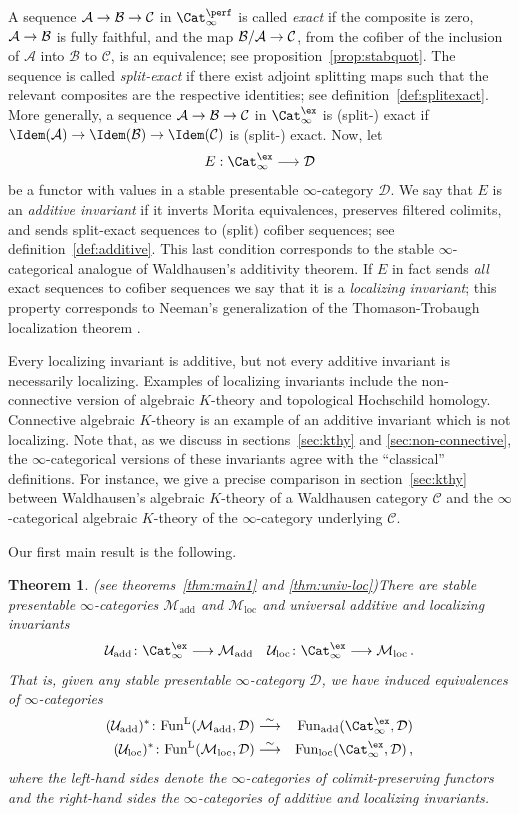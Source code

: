 \documentclass{amsart}
\renewcommand{\to}{\mathchoice{\longrightarrow}{\rightarrow}{\rightarrow}{\rightarrow}}
\newcommand{\cD}{{\mathcal D}}
\newcommand{\cM}{{\mathcal M}}
\newcommand{\cU}{{\mathcal U}}
\let\catsymbfont\mathcal
\newcommand{\aA}{{\catsymbfont{A}}}
\newcommand{\aB}{{\catsymbfont{B}}}
\newcommand{\aC}{{\catsymbfont{C}}}
\newcommand{\aD}{{\catsymbfont{D}}}
\renewcommand{\L}{\mathrm{L}}
\newcommand{\stabcat}{\Cat_\i^{\ex}}
\newcommand{\idemstabcat}{\Cat_\i^{\perf}}
\newcommand{\Fun}{\mathrm{Fun}} %
\newcommand{\too}{\longrightarrow}%
\renewcommand{\i}{\infty}
\newcommand{\Motadd}{\cM_{\mathrm{add}}}
\newcommand{\Motloc}{\cM_\mathrm{loc}}
\newcommand{\Umot}{\cU_{\mathrm{add}}}
\newcommand{\Uloc}{\cU_{\mathrm{loc}}}
\numberwithin{equation}{section}
\newtheorem{theorem}[equation]{Theorem}
\theoremstyle{definition}
\begin{document}
A sequence $\aA \to \aB \to \aC$ in $\idemstabcat$ is called
{\em exact} if the composite is zero, $\aA \to \aB$ is fully faithful, and the map
$\aB/\aA\to\aC$, from the cofiber of the inclusion of $\aA$ into $\aB$
to $\aC$, is an equivalence; see proposition~\ref{prop:stabquot}. The
sequence is called {\em split-exact} if there exist adjoint splitting
maps such that the relevant composites are the respective identities;
see definition~\ref{def:splitexact}.  More generally, a sequence
$\aA\to\aB\to\aC$ in $\stabcat$ is (split-) exact if
$\Idem(\aA)\to\Idem(\aB)\to\Idem(\aC)$ is (split-) exact.
Now, let
\[
E: \stabcat \too \cD
\]
be a functor with values in a stable presentable $\i$-category $\cD$.
We say that $E$ is an {\em additive invariant} if it inverts Morita
equivalences, preserves filtered colimits, and sends split-exact
sequences to (split) cofiber sequences; see
definition~\ref{def:additive}.  This last condition corresponds to the
stable $\i$-categorical analogue of Waldhausen's additivity theorem.  If $E$
in fact sends {\em all} exact sequences to cofiber sequences we say
that it is a {\em localizing invariant}; this property corresponds to
Neeman's generalization of the Thomason-Trobaugh localization
theorem \cite{NeemanLoc, TT}.  

Every localizing invariant is additive, but not every additive
invariant is necessarily localizing.  Examples of localizing
invariants include the non-connective version of
algebraic $K$-theory and topological Hochschild homology.  Connective
algebraic $K$-theory is an example of an additive invariant which is
not localizing.  Note that, as we discuss in
sections~\ref{sec:kthy} and \ref{sec:non-connective}, the
$\i$-categorical versions of these invariants agree with the
``classical'' definitions.  For instance, we give a precise comparison
in section~\ref{sec:kthy} between Waldhausen's algebraic $K$-theory of
a Waldhausen category $\aC$ and the $\i$-categorical algebraic
$K$-theory of the $\i$-category underlying $\aC$.

Our first main result is the following.

\begin{theorem}{(see theorems~\ref{thm:main1}
and \ref{thm:univ-loc})}\label{thm:Imain1}
There are stable presentable $\i$-categories $\Motadd$ and $\Motloc$
and {\em universal} additive and localizing invariants 
\begin{eqnarray}\label{eq:univ-add/loc}
\Umot \colon \stabcat \too \Motadd && \Uloc \colon \stabcat \too \Motloc\,.
\end{eqnarray}
That is, given any stable presentable $\i$-category
$\aD$, we have induced equivalences of $\i$-categories
\begin{eqnarray*}
(\Umot)^*\colon\Fun^{\L}(\Motadd,\aD)&\stackrel{\sim}{\too}& \Fun_{\mathrm{add}}(\stabcat,\aD)\\
(\Uloc)^*\colon\Fun^{\L}(\Motloc,\aD)&\stackrel{\sim}{\too}& \Fun_{\mathrm{loc}}(\stabcat,\aD)\,,
\end{eqnarray*}
where the left-hand sides denote the $\i$-categories of
colimit-preserving functors and the right-hand sides the
$\i$-categories of additive and localizing invariants.
\end{theorem}
\end{document}
